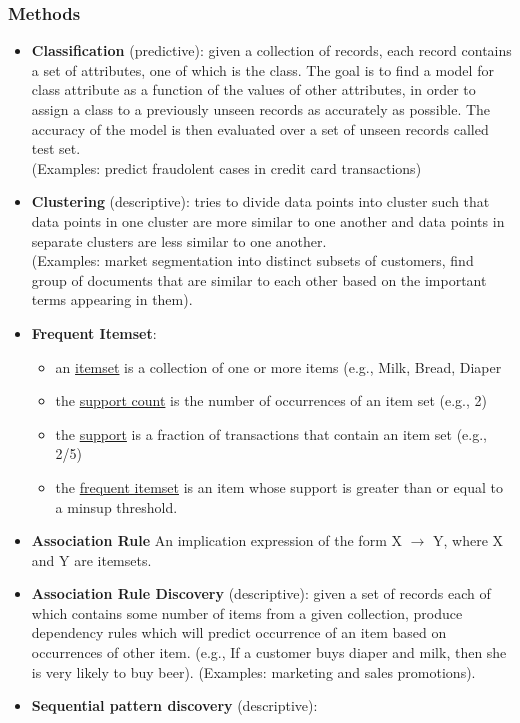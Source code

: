 \documentclass[10pt,a4paper]{article}
\begin{document}
\subsubsection{Methods}
\begin{itemize}
	\item \textbf{Classification} (predictive): given a collection of records, each record contains a set of attributes, one of which is the class. The goal is to find a model for class attribute as a function of the values of other attributes, in order to assign a class to a previously unseen records as accurately as possible. The accuracy of the model is then evaluated over a set of unseen records called test set. \\ (Examples: predict fraudolent cases in credit card transactions)
	\item \textbf{Clustering} (descriptive): tries to divide data points into cluster such that data points in one cluster are more similar to one another and data points in separate clusters are less similar to one another. \\ 
	(Examples: market segmentation into distinct subsets of customers, find group of documents that are similar to each other based on the important terms appearing in them).
	\item \textbf{Frequent Itemset}: 
	\begin{itemize}
		\item an \uline{itemset} is a collection of one or more items (e.g., {Milk, Bread, Diaper}
		\item the \uline{support count} is the number of occurrences of an item set (e.g., 2)
		\item the \uline{support} is a fraction of transactions that contain an item set (e.g., 2/5)
		\item the \uline{frequent itemset} is an item whose support is greater than or equal to a minsup threshold.
	\end{itemize}	 
	\item \textbf{Association Rule} An implication expression of the form X $\rightarrow$ Y, where X and Y are itemsets.
	\item \textbf{Association Rule Discovery} (descriptive): given a set of records each of which contains some number of items from a given collection, produce dependency rules which will predict occurrence of an item based on occurrences of other item. (e.g., If a customer buys diaper and milk, then she is very likely to buy beer). (Examples: marketing and sales promotions).
	\item \textbf{Sequential pattern discovery} (descriptive): 

\end{itemize}
\end{document}
